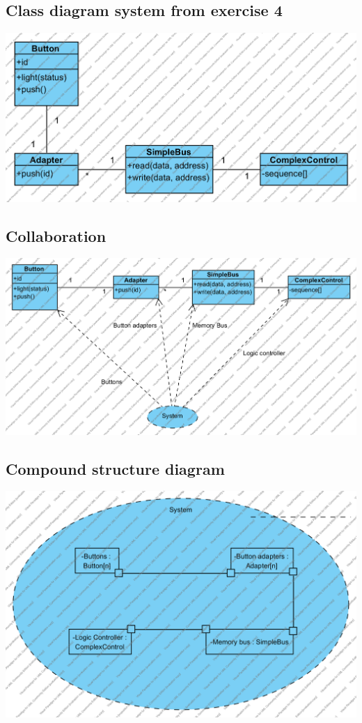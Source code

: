 \documentclass{article}
\begin{document}
\subsection{Class diagram system from exercise 4}
  \includegraphics[width=0.8\linewidth]{../class3}
\subsection{Collaboration}
  \includegraphics[width=\linewidth]{../class4}
\subsection{Compound structure diagram}
  \includegraphics[width=0.9\linewidth]{../comp2}
\end{document}

